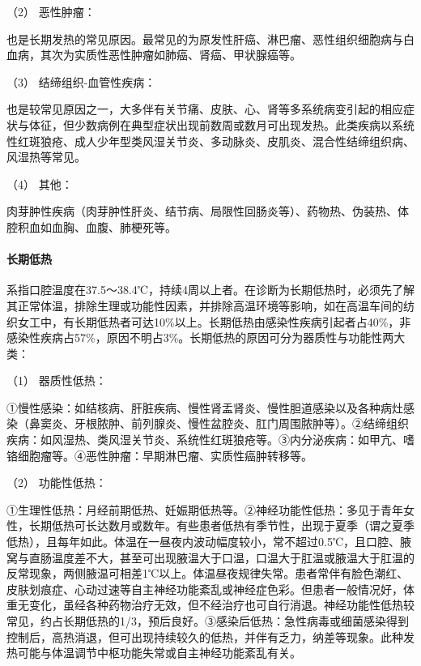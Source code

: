 \hypertarget{text00008.htmlux5cux23CHP1-1-2-4-2-2}{}
（2） 恶性肿瘤：

也是长期发热的常见原因。最常见的为原发性肝癌、淋巴瘤、恶性组织细胞病与白血病，其次为实质性恶性肿瘤如肺癌、肾癌、甲状腺癌等。

\hypertarget{text00008.htmlux5cux23CHP1-1-2-4-2-3}{}
（3） 结缔组织-血管性疾病：

也是较常见原因之一，大多伴有关节痛、皮肤、心、肾等多系统病变引起的相应症状与体征，但少数病例在典型症状出现前数周或数月可出现发热。此类疾病以系统性红斑狼疮、成人少年型类风湿关节炎、多动脉炎、皮肌炎、混合性结缔组织病、风湿热等常见。

\hypertarget{text00008.htmlux5cux23CHP1-1-2-4-2-4}{}
（4） 其他：

肉芽肿性疾病（肉芽肿性肝炎、结节病、局限性回肠炎等）、药物热、伪装热、体腔积血如血胸、血腹、肺梗死等。

\paragraph{长期低热}

系指口腔温度在37.5～38.4℃，持续4周以上者。在诊断为长期低热时，必须先了解其正常体温，排除生理或功能性因素，并排除高温环境等影响，如在高温车间的纺织女工中，有长期低热者可达10\%以上。长期低热由感染性疾病引起者占40\%，非感染性疾病占57\%，原因不明占3\%。长期低热的原因可分为器质性与功能性两大类：

\hypertarget{text00008.htmlux5cux23CHP1-1-2-4-3-1}{}
（1） 器质性低热：

①慢性感染：如结核病、肝脏疾病、慢性肾盂肾炎、慢性胆道感染以及各种病灶感染（鼻窦炎、牙根脓肿、前列腺炎、慢性盆腔炎、肛门周围脓肿等）。②结缔组织疾病：如风湿热、类风湿关节炎、系统性红斑狼疮等。③内分泌疾病：如甲亢、嗜铬细胞瘤等。④恶性肿瘤：早期淋巴瘤、实质性癌肿转移等。

\hypertarget{text00008.htmlux5cux23CHP1-1-2-4-3-2}{}
（2） 功能性低热：

①生理性低热：月经前期低热、妊娠期低热等。②神经功能性低热：多见于青年女性，长期低热可长达数月或数年。有些患者低热有季节性，出现于夏季（谓之夏季低热），且每年如此。体温在一昼夜内波动幅度较小，常不超过0.5℃，且口腔、腋窝与直肠温度差不大，甚至可出现腋温大于口温，口温大于肛温或腋温大于肛温的反常现象，两侧腋温可相差1℃以上。体温昼夜规律失常。患者常伴有脸色潮红、皮肤划痕症、心动过速等自主神经功能紊乱或神经症色彩。但患者一般情况好，体重无变化，虽经各种药物治疗无效，但不经治疗也可自行消退。神经功能性低热较常见，约占长期低热的1/3，预后良好。③感染后低热：急性病毒或细菌感染得到控制后，高热消退，但可出现持续较久的低热，并伴有乏力，纳差等现象。此种发热可能与体温调节中枢功能失常或自主神经功能紊乱有关。

